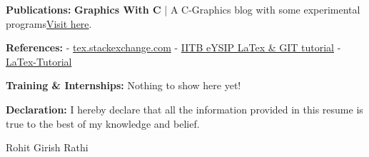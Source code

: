 \documentclass[11pt]{article}
\begin{document}
\begin{center}
\begin{minipage}[t]{0.36\textwidth}
			\raggedright
			\begin{large}
				\textbf{Publications:}\linebreak\linebreak%
				{\small
				\textbf{Graphics With C} | A C-Graphics blog with some experimental programs\linebreak\href{https://graphicswithc.wordpress.com/}{Visit here}.
				}
			\end{large}
		\end{minipage}%
		\begin{minipage}[t]{0.36\textwidth}
			\raggedright
			\begin{large}
				\textbf{References:}\linebreak\linebreak%
				{\small
					- \href{https://tex.stackexchange.com}{tex.stackexchange.com}\linebreak
					- \href{https://github.com/lohitpenu/Internship-eYSIP-2018}{IITB eYSIP LaTex \& GIT tutorial}\linebreak
					- \href{https://www.latex-tutorial.com}{LaTex-Tutorial}
				}
			\end{large}
		\end{minipage}%
		\begin{minipage}[t]{0.28\textwidth}
			\raggedright
			\begin{large}
				\textbf{Training \& Internships:}\linebreak\linebreak%
				{\small Nothing to show here yet!}
			\end{large}
		\end{minipage}%
		\linebreak\linebreak\linebreak\linebreak
		\textbf{Declaration:} I hereby declare that all the information provided in this resume is true to the best of my knowledge and belief.\linebreak\linebreak\linebreak
		\begin{minipage}[t]{0\textwidth}
			\raggedright
		\end{minipage}%
		\begin{minipage}[t]{1\textwidth}
			\raggedleft
			Rohit Girish Rathi
		\end{minipage}%
	\end{center}
\end{document}

